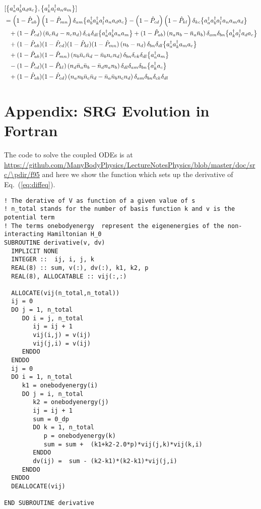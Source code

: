 \begin{align}
  &\comm{\nord{\aaO_{a}\aaO_{b}\aO_{d}\aO_{c}}}{\nord{\aaO_{k}\aaO_{l}\aO_{n}\aO_{m}}}
  \notag\\
  &=
    \left(1-\PO_{ab}\right)\left(1-\PO_{mn}\right)\delta_{am}\nord{\aaO_{b}\aaO_{k}\aaO_{l}\aO_{n}\aO_{d}\aO_{c}}
    -\left(1-\PO_{cd}\right)\left(1-\PO_{kl}\right)\delta_{kc}\nord{\aaO_{a}\aaO_{b}\aaO_{l}\aO_{n}\aO_{m}\aO_{d}}
  \notag\\
%  
  &\hphantom{=}
    +(1-\PO_{cd})\left(\nn_{c}\nn_{d} - n_c n_d \right)\delta_{ck}\delta_{dl}\nord{\aaO_{a}\aaO_{b}\aO_{n}\aO_{m}}
    +(1-\PO_{ab})\left(n_a n_b -\nn_{a} \nn_{b} \right)\delta_{am}\delta_{bn}\nord{\aaO_{k}\aaO_{l}\aO_{d}\aO_{c}}
  \notag\\
  &\hphantom{=}
    +(1-\PO_{ab})(1-\PO_{cd})(1-\PO_{kl})(1-\PO_{mn})\left(n_{b} - n_{d}\right)\delta_{bn}\delta_{dl}
    \nord{\aaO_{a}\aaO_{k}\aO_{m}\aO_{c}}
  \notag\\
%
  &\hphantom{=}
   +(1-\PO_{ab})(1-\PO_{mn})\left(n_{b}\nn_{c}\nn_{d} - \nn_{b}n_{c}n_{d}\right)\delta_{bn}\delta_{ck}\delta_{dl}
   \nord{\aaO_{a}\aO_{m}}
  \notag\\
% 
  &\hphantom{=}
   -(1-\PO_{cd})(1-\PO_{kl})\left(n_{d}\nn_{a}\nn_{b} - \nn_{d}n_{a}n_{b}\right)\delta_{dl}\delta_{am}\delta_{bn}
   \nord{\aaO_{k}\aO_{c}}
  \notag\\
% 
% 
  &\hphantom{=}
  +(1-\PO_{ab})(1-\PO_{cd})
    \left(n_{a} n_{b} \nn_{c} \nn_{d} - \nn_{a} \nn_{b} n_{c} n_{d}\right)\delta_{am}\delta_{bn}\delta_{ck}\delta_{dl}
% 
\end{align}


\section*{Appendix: SRG Evolution in Fortran}
The code to solve the coupled ODEs is at
\url{https://github.com/ManyBodyPhysics/LectureNotesPhysics/blob/master/doc/src/\pdir/f95} and here we show the function which sets up the derivative of Eq.~(\ref{eq:diffeq}). 
\begin{lstlisting}
! The derative of V as function of a given value of s
! n_total stands for the number of basis function k and v is the potential term
! The terms onebodyenergy  represent the eigenenergies of the non-interacting Hamiltonian H_0
SUBROUTINE derivative(v, dv)
  IMPLICIT NONE
  INTEGER ::  ij, i, j, k
  REAL(8) :: sum, v(:), dv(:), k1, k2, p
  REAL(8), ALLOCATABLE :: vij(:,:)

  ALLOCATE(vij(n_total,n_total)) 
  ij = 0
  DO j = 1, n_total
     DO i = j, n_total
        ij = ij + 1
        vij(i,j) = v(ij)
        vij(j,i) = v(ij)
     ENDDO
  ENDDO
  ij = 0
  DO i = 1, n_total
     k1 = onebodyenergy(i) 
     DO j = i, n_total
        k2 = onebodyenergy(j) 
        ij = ij + 1
        sum = 0_dp
        DO k = 1, n_total
           p = onebodyenergy(k) 
           sum = sum +  (k1+k2-2.0*p)*vij(j,k)*vij(k,i) 
        ENDDO
        dv(ij) =  sum - (k2-k1)*(k2-k1)*vij(j,i)
     ENDDO
  ENDDO
  DEALLOCATE(vij)

END SUBROUTINE derivative
\end{lstlisting}

